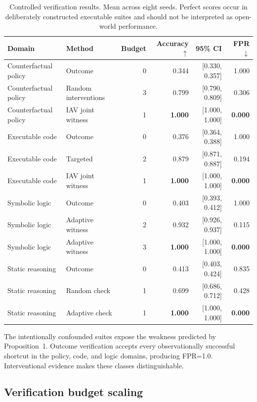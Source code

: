 \documentclass[10pt]{article}
\begin{document}
\begin{table}[t]
\centering
\caption{Controlled verification results. Mean across eight seeds. Perfect scores occur in deliberately constructed executable suites and should not be interpreted as open-world performance.}
\label{tab:main}
\begin{tabular}{llrrrr}
\toprule
Domain & Method & Budget & Accuracy $\uparrow$ & 95\% CI & FPR $\downarrow$\\
\midrule
Counterfactual policy & Outcome & 0 & 0.344 & [0.330, 0.357] & 1.000\\
Counterfactual policy & Random interventions & 3 & 0.799 & [0.790, 0.809] & 0.306\\
Counterfactual policy & IAV joint witness & 1 & \textbf{1.000} & [1.000, 1.000] & \textbf{0.000}\\
\midrule
Executable code & Outcome & 0 & 0.376 & [0.364, 0.388] & 1.000\\
Executable code & Targeted & 2 & 0.879 & [0.871, 0.887] & 0.194\\
Executable code & IAV joint witness & 1 & \textbf{1.000} & [1.000, 1.000] & \textbf{0.000}\\
\midrule
Symbolic logic & Outcome & 0 & 0.403 & [0.393, 0.412] & 1.000\\
Symbolic logic & Adaptive witness & 2 & 0.932 & [0.926, 0.937] & 0.115\\
Symbolic logic & Adaptive witness & 3 & \textbf{1.000} & [1.000, 1.000] & \textbf{0.000}\\
\midrule
Static reasoning & Outcome & 0 & 0.413 & [0.403, 0.424] & 0.835\\
Static reasoning & Random check & 1 & 0.699 & [0.686, 0.712] & 0.428\\
Static reasoning & Adaptive check & 1 & \textbf{1.000} & [1.000, 1.000] & \textbf{0.000}\\
\bottomrule
\end{tabular}
\end{table}

The intentionally confounded suites expose the weakness predicted by Proposition~1. Outcome verification accepts every observationally successful shortcut in the policy, code, and logic domains, producing FPR=1.0. Interventional evidence makes these classes distinguishable.

\subsection{Verification budget scaling}
\end{document}
